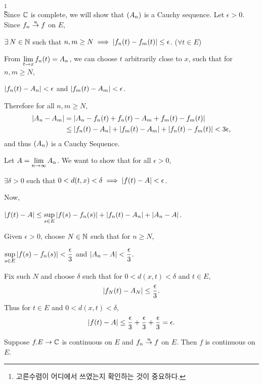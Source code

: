 \pf\footnote{고른수렴이 어디에서 쓰였는지 확인하는 것이 중요하다.}\\
 Since \(\mathbb{C}\) is complete, we will show that \(\left( A_n \right)\) is a Cauchy sequence. Let \(\epsilon > 0\). Since \(f_n \overset{u}{\rightarrow} f\) on \(E\),
\begin{center}
    \(\exists N \in \N\) such that \(n, m\geq N \implies \left| f_n(t) - f_m(t) \right| \leq \epsilon\). (\(\forall t\in E\))
\end{center}
From \(\displaystyle \lim_{t \rightarrow x} f_n(t) = A_n\), we can choose \(t\) arbitrarily close to \(x\), such that for \(n, m \geq N\),
\begin{center}
    \(\left| f_n(t) - A_n \right| < \epsilon\) and \(\left| f_m(t) - A_m \right| < \epsilon\).
\end{center}
Therefore for all \(n, m \geq N\),
\[
    \begin{aligned}
        \left| A_n - A_m \right| &= \left| A_n - f_n(t) + f_n(t) - A_m + f_m(t) - f_m(t) \right|\\
        &\leq \left| f_n(t) - A_n \right| + \left| f_m(t) - A_m \right| + \left| f_n(t) - f_m(t) \right| < 3\epsilon,
    \end{aligned}
\]
and thus \(\left( A_n \right)\) is a Cauchy Sequence.

 Let \(A = \displaystyle \lim_{n \rightarrow \infty} A_n\). We want to show that for all \(\epsilon > 0\),
\begin{center}
    \(\exists \delta > 0\) such that \(0 < d(t, x) < \delta \implies \left| f(t) - A \right| < \epsilon\).
\end{center}
Now,
\begin{center}
    \(\displaystyle \left| f(t) - A \right| \leq \sup_{s \in E} \left| f(s) - f_n(s) \right| + \left| f_n(t) - A_n \right| + \left| A_n - A \right|\).
\end{center}
Given \(\epsilon > 0\), choose \(N \in \mathbb{N}\) such that for \(n \geq N\),
\begin{center}
    \(\displaystyle \sup_{s\in E} \left| f(s) - f_n(s) \right| < \frac{\epsilon}{3}\) and \(\displaystyle \left| A_n - A \right| < \frac{\epsilon}{3}\).
\end{center}
Fix such \(N\) and choose \(\delta\) such that for \(0 < d(x, t) < \delta\) and \(t \in E\),
\[
    \left| f_N(t) - A_N \right| \leq\frac{\epsilon}{3}.
\]
Thus for \(t\in E\) and \(0 < d(x, t) < \delta\),
\[
    \left| f(t) - A \right| \leq \frac{\epsilon}{3} + \frac{\epsilon}{3} + \frac{\epsilon}{3} = \epsilon.
\]

 Suppose \(f_: E \rightarrow \mathbb{C}\) is continuous on \(E\) and \(f_n \overset{u}{\rightarrow} f\) on \(E\). Then \(f\) is continuous on \(E\).

